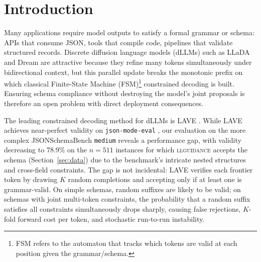 \begin{abstract}
The leading constrained decoding method for discrete diffusion language models (dLLMs) reports ${\approx}99\%$ validity on simple JSON benchmarks, but this does not transfer to harder schemas. On JSONSchemaBench \texttt{medium}, stochastic lookahead-verify achieves only 78.9\% validity ($n{=}511$), consuming 255.3 lookahead draws per instance and timing out on 61 instances. We address this in two steps. \textbf{Dgrammar} replaces stochastic lookahead with deterministic frontier masking, AIMD batching, and async mask overlap, raising validity to 84.9\% and eliminating all timeouts. \textbf{DPGrammar} adds a Viterbi DP that jointly repairs violated token spans over grammar DFA states, reaching \textbf{95.3\%} validity with 1.06 mean resamples. Code: \url{https://github.com/buffett0323/anlp_final}.
\end{abstract}

\section{Introduction}

Many applications require model outputs to satisfy a formal grammar or schema: APIs that consume JSON, tools that compile code, pipelines that validate structured records. Discrete diffusion language models (dLLMs) such as LLaDA \citep{llada} and Dream \citep{dream} are attractive because they refine many tokens simultaneously under bidirectional context, but this parallel update breaks the monotonic prefix on which classical 
Finite-State Machine (FSM)\footnote{FSM refers to the automaton that tracks which tokens are valid at each position given the grammar/schema.} constrained decoding is built. Ensuring schema compliance without destroying the model's joint proposals is therefore an open problem with direct deployment consequences.

The leading constrained decoding method for dLLMs is LAVE \citep{zhang2026lookaheadthenverifyreliableconstraineddecoding}. While LAVE achieves near-perfect validity on \texttt{json-mode-eval} \citep{nousresearch2024jsonmodeeval}, our evaluation on the more complex JSONSchemaBench \citep{geng2025jsonschemabenchrigorousbenchmarkstructured} \texttt{medium} reveals a performance gap, with validity decreasing to 78.9\% on the $n{=}511$ instances for which \textsc{llguidance} accepts the schema (Section~\ref{sec:data}) due to the benchmark's intricate nested structures and cross-field constraints. The gap is not incidental: LAVE verifies each frontier token by drawing $K$ random completions and accepting only if at least one is grammar-valid. On simple schemas, random suffixes are likely to be valid; on schemas with joint multi-token constraints, the probability that a random suffix satisfies all constraints simultaneously drops sharply, causing false rejections, $K$-fold forward cost per token, and stochastic run-to-run instability.

